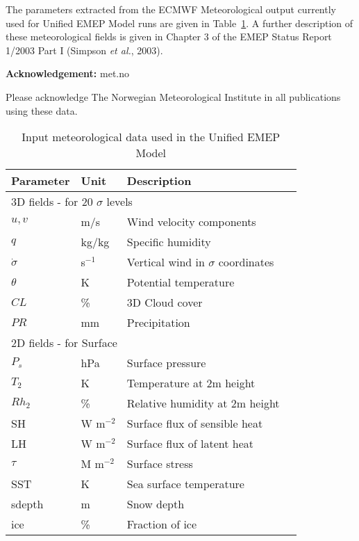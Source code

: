 The parameters extracted from the ECMWF Meteorological output
currently used for Unified EMEP Model runs are given in 
Table~\ref{Tab:metinput}. A further description of these
meteorological fields is given in Chapter 3 of the EMEP Status Report
1/2003 Part I (Simpson {\sl et al.}, 2003).

{\bf Acknowledgement:} met.no

Please acknowledge The Norwegian Meteorological Institute in all
publications using these data.
 
\begin{table}[hb]
\caption{Input meteorological data used in the Unified EMEP Model
   \label{Tab:metinput}}
\begin{tabular}{p{6cm}lll}
\hline
Parameter      & Unit & Description          \\
\hline
\multicolumn{3}{l}{3D fields - for 20 $\sigma$ levels} \\
$u,v$  &  m/s     & Wind velocity components   \\
$q$    &  kg/kg   & Specific humidity           \\
$\dot{\sigma}$ & s$^{-1}$ & Vertical wind in $\sigma$ coordinates \\
$\theta$       & K  & Potential temperature \\
$CL$             & \% & 3D Cloud cover            \\
$PR$             & mm & Precipitation         \\
\hline
\multicolumn{3}{l}{2D fields - for Surface} \\
$P_s$             & hPa & Surface pressure                     \\
$T_2$          & K  & Temperature at 2m height               \\
$Rh_2$             & \% & Relative humidity at 2m height \\
SH              & W m$^{-2}$ & Surface flux of sensible heat \\
LH             & W m$^{-2}$ & Surface flux of latent heat \\
$\tau$         & M m$^{-2}$ & Surface stress               \\
SST            & K & Sea surface temperature \\
sdepth         & m & Snow depth \\
ice            & \% & Fraction of ice \\  
\hline
\end{tabular}
\end{table}


